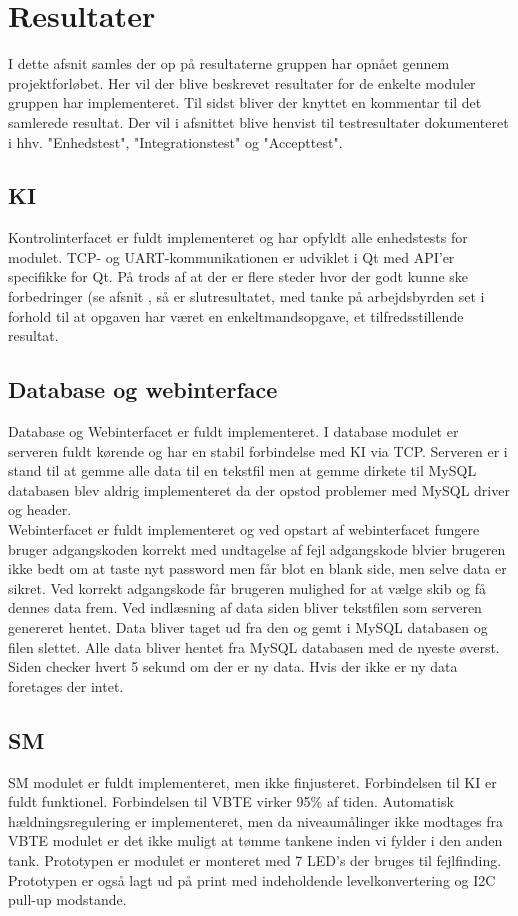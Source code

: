 \section{Resultater}
I dette afsnit samles der op på resultaterne gruppen har opnået gennem projektforløbet. Her vil der blive beskrevet resultater for de enkelte moduler gruppen har implementeret. Til sidst bliver der knyttet en kommentar til det samlerede resultat. Der vil i afsnittet blive henvist til testresultater dokumenteret i hhv. "Enhedstest", "Integrationstest" og "Accepttest".

\subsection{KI}
Kontrolinterfacet er fuldt implementeret og har opfyldt alle enhedstests for modulet. TCP- og UART-kommunikationen er udviklet i Qt med API'er specifikke for Qt. På trods af at der er flere steder hvor der godt kunne ske forbedringer (se afsnit , så er slutresultatet, med tanke på arbejdsbyrden set i forhold til at opgaven har været en enkeltmandsopgave, et tilfredsstillende resultat.\\

\subsection{Database og webinterface}
Database og Webinterfacet er fuldt implementeret. I database modulet er serveren fuldt kørende og har en stabil forbindelse med KI via TCP. Serveren er i stand til at gemme alle data til en tekstfil men at gemme dirkete til MySQL databasen blev aldrig implementeret da der opstod problemer med MySQL driver og header.\\
Webinterfacet er fuldt implementeret og ved opstart af webinterfacet fungere bruger adgangskoden korrekt med undtagelse af fejl adgangskode blvier brugeren ikke bedt om at taste nyt password men får blot en blank side, men selve data er sikret. Ved korrekt adgangskode får brugeren mulighed for at vælge skib og få dennes data frem. Ved indlæsning af data siden bliver tekstfilen som serveren genereret hentet. Data bliver taget ud fra den og gemt i MySQL databasen og filen slettet. Alle data bliver hentet fra MySQL databasen med de nyeste øverst. Siden checker hvert 5 sekund om der er ny data. Hvis der ikke er ny data foretages der intet.

\subsection{SM}
SM modulet er fuldt implementeret, men ikke finjusteret. Forbindelsen til KI er fuldt funktionel. Forbindelsen til VBTE virker 95\% af tiden. Automatisk hældningsregulering er implementeret, men da niveaumålinger ikke modtages fra VBTE modulet er det ikke muligt at tømme tankene inden vi fylder i den anden tank. Prototypen er modulet er monteret med 7 LED's der bruges til fejlfinding. Prototypen er også lagt ud på print med indeholdende levelkonvertering og I2C pull-up modstande.

